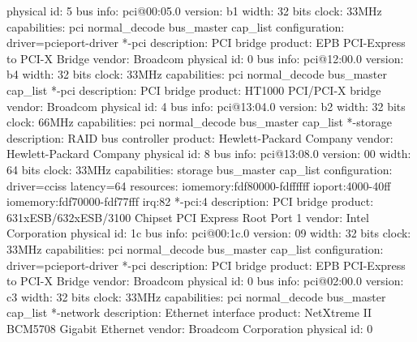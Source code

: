 \documentclass[mingoth,a4paper]{jsarticle}
\begin{document}
{{{{{{{{{\begin{commandline}
             physical id: 5
             bus info: pci@00:05.0
             version: b1
             width: 32 bits
             clock: 33MHz
             capabilities: pci normal_decode bus_master cap_list
             configuration: driver=pcieport-driver
           *-pci
                description: PCI bridge
                product: EPB PCI-Express to PCI-X Bridge
                vendor: Broadcom
                physical id: 0
                bus info: pci@12:00.0
                version: b4
                width: 32 bits
                clock: 33MHz
                capabilities: pci normal_decode bus_master cap_list
              *-pci
                   description: PCI bridge
                   product: HT1000 PCI/PCI-X bridge
                   vendor: Broadcom
                   physical id: 4
                   bus info: pci@13:04.0
                   version: b2
                   width: 32 bits
                   clock: 66MHz
                   capabilities: pci normal_decode bus_master cap_list
              *-storage
                   description: RAID bus controller
                   product: Hewlett-Packard Company
                   vendor: Hewlett-Packard Company
                   physical id: 8
                   bus info: pci@13:08.0
                   version: 00
                   width: 64 bits
                   clock: 33MHz
                   capabilities: storage bus_master cap_list
                   configuration: driver=cciss latency=64
                   resources: iomemory:fdf80000-fdffffff ioport:4000-40ff iomemory:fdf70000-fdf77fff irq:82
        *-pci:4
             description: PCI bridge
             product: 631xESB/632xESB/3100 Chipset PCI Express Root Port 1
             vendor: Intel Corporation
             physical id: 1c
             bus info: pci@00:1c.0
             version: 09
             width: 32 bits
             clock: 33MHz
             capabilities: pci normal_decode bus_master cap_list
             configuration: driver=pcieport-driver
           *-pci
                description: PCI bridge
                product: EPB PCI-Express to PCI-X Bridge
                vendor: Broadcom
                physical id: 0
                bus info: pci@02:00.0
                version: c3
                width: 32 bits
                clock: 33MHz
                capabilities: pci normal_decode bus_master cap_list
              *-network
                   description: Ethernet interface
                   product: NetXtreme II BCM5708 Gigabit Ethernet
                   vendor: Broadcom Corporation
                   physical id: 0

\end{commandline}}}}}}}}}}
\end{document}
